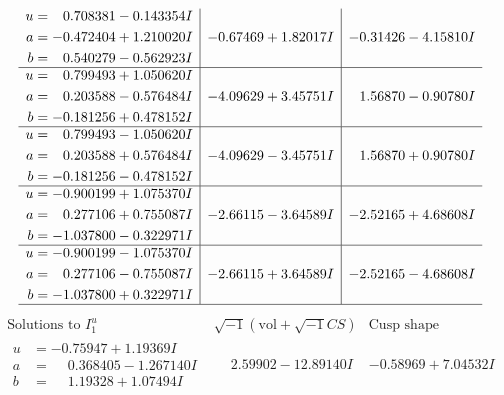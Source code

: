 \documentclass[1p]{elsarticle_modified}
\theoremstyle{definition}
\newcommand{\I}{\sqrt{-1}}
\begin{document}
$$\begin{array}{c|c|c}
\begin{aligned}
u &= \phantom{-}0.708381 - 0.143354 I \\
a &= -0.472404 + 1.210020 I \\
b &= \phantom{-}0.540279 - 0.562923 I\end{aligned}
 & -0.67469 + 1.82017 I & -0.31426 - 4.15810 I \\ \hline\begin{aligned}
u &= \phantom{-}0.799493 + 1.050620 I \\
a &= \phantom{-}0.203588 - 0.576484 I \\
b &= -0.181256 + 0.478152 I\end{aligned}
 & -4.09629 + 3.45751 I & \phantom{-}1.56870 - 0.90780 I \\ \hline\begin{aligned}
u &= \phantom{-}0.799493 - 1.050620 I \\
a &= \phantom{-}0.203588 + 0.576484 I \\
b &= -0.181256 - 0.478152 I\end{aligned}
 & -4.09629 - 3.45751 I & \phantom{-}1.56870 + 0.90780 I \\ \hline\begin{aligned}
u &= -0.900199 + 1.075370 I \\
a &= \phantom{-}0.277106 + 0.755087 I \\
b &= -1.037800 - 0.322971 I\end{aligned}
 & -2.66115 - 3.64589 I & -2.52165 + 4.68608 I \\ \hline\begin{aligned}
u &= -0.900199 - 1.075370 I \\
a &= \phantom{-}0.277106 - 0.755087 I \\
b &= -1.037800 + 0.322971 I\end{aligned}
 & -2.66115 + 3.64589 I & -2.52165 - 4.68608 I\\
 \hline 
 \end{array}$$\newpage$$\begin{array}{c|c|c}  
\text{Solutions to }I^u_{1}& \I (\text{vol} + \sqrt{-1}CS) & \text{Cusp shape}\\
 \hline 
\begin{aligned}
u &= -0.75947 + 1.19369 I \\
a &= \phantom{-}0.368405 - 1.267140 I \\
b &= \phantom{-}1.19328 + 1.07494 I\end{aligned}
 & \phantom{-}2.59902 - 12.89140 I & -0.58969 + 7.04532 I \\ \hline\begin{aligned}

\end{aligned}
\end{array}$$
\end{document}
